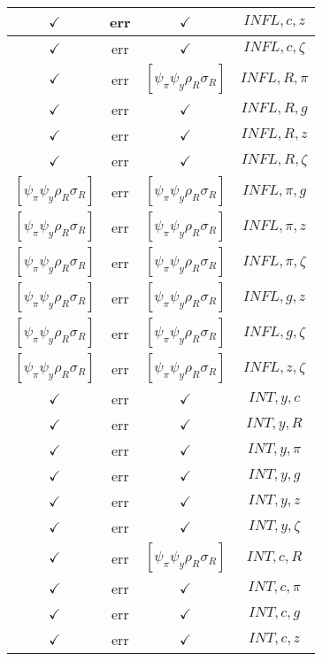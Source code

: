 \documentclass[a4paper,10pt]{article}
\begin{document}
\begin{longtable}{|c|c|c|c|}
\hline
$\checkmark$ & err & $\checkmark$ & ${INFL},{c},{z}$ \\
\hline
$\checkmark$ & err & $\checkmark$ & ${INFL},{c},{\zeta}$ \\
\hline
$\checkmark$ & err & $[\psi_\pi \psi_y \rho_R \sigma_R ]$ & ${INFL},{R},{\pi}$ \\
\hline
$\checkmark$ & err & $\checkmark$ & ${INFL},{R},{g}$ \\
\hline
$\checkmark$ & err & $\checkmark$ & ${INFL},{R},{z}$ \\
\hline
$\checkmark$ & err & $\checkmark$ & ${INFL},{R},{\zeta}$ \\
\hline
$[\psi_\pi \psi_y \rho_R \sigma_R ]$ & err & $[\psi_\pi \psi_y \rho_R \sigma_R ]$ & ${INFL},{\pi},{g}$ \\
\hline
$[\psi_\pi \psi_y \rho_R \sigma_R ]$ & err & $[\psi_\pi \psi_y \rho_R \sigma_R ]$ & ${INFL},{\pi},{z}$ \\
\hline
$[\psi_\pi \psi_y \rho_R \sigma_R ]$ & err & $[\psi_\pi \psi_y \rho_R \sigma_R ]$ & ${INFL},{\pi},{\zeta}$ \\
\hline
$[\psi_\pi \psi_y \rho_R \sigma_R ]$ & err & $[\psi_\pi \psi_y \rho_R \sigma_R ]$ & ${INFL},{g},{z}$ \\
\hline
$[\psi_\pi \psi_y \rho_R \sigma_R ]$ & err & $[\psi_\pi \psi_y \rho_R \sigma_R ]$ & ${INFL},{g},{\zeta}$ \\
\hline
$[\psi_\pi \psi_y \rho_R \sigma_R ]$ & err & $[\psi_\pi \psi_y \rho_R \sigma_R ]$ & ${INFL},{z},{\zeta}$ \\
\hline
$\checkmark$ & err & $\checkmark$ & ${INT},{y},{c}$ \\
\hline
$\checkmark$ & err & $\checkmark$ & ${INT},{y},{R}$ \\
\hline
$\checkmark$ & err & $\checkmark$ & ${INT},{y},{\pi}$ \\
\hline
$\checkmark$ & err & $\checkmark$ & ${INT},{y},{g}$ \\
\hline
$\checkmark$ & err & $\checkmark$ & ${INT},{y},{z}$ \\
\hline
$\checkmark$ & err & $\checkmark$ & ${INT},{y},{\zeta}$ \\
\hline
$\checkmark$ & err & $[\psi_\pi \psi_y \rho_R \sigma_R ]$ & ${INT},{c},{R}$ \\
\hline
$\checkmark$ & err & $\checkmark$ & ${INT},{c},{\pi}$ \\
\hline
$\checkmark$ & err & $\checkmark$ & ${INT},{c},{g}$ \\
\hline
$\checkmark$ & err & $\checkmark$ & ${INT},{c},{z}$ \\

\end{longtable}
\end{document}
